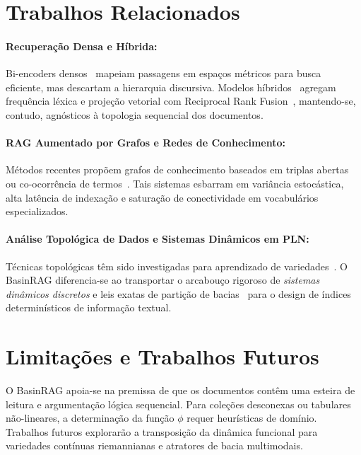 \documentclass[10pt,twocolumn]{article}
\theoremstyle{definition}
\begin{document}
\section{Trabalhos Relacionados}

\paragraph{Recuperação Densa e Híbrida:}
Bi-encoders densos~\cite{karpukhin2020dense,xiao2023c} mapeiam passagens em espaços métricos para busca eficiente, mas descartam a hierarquia discursiva. Modelos híbridos~\cite{formal2021splade} agregam frequência léxica e projeção vetorial com Reciprocal Rank Fusion~\cite{cormack2009reciprocal}, mantendo-se, contudo, agnósticos à topologia sequencial dos documentos.

\paragraph{RAG Aumentado por Grafos e Redes de Conhecimento:}
Métodos recentes propõem grafos de conhecimento baseados em triplas abertas ou co-ocorrência de termos~\cite{pan2024unifying}. Tais sistemas esbarram em variância estocástica, alta latência de indexação e saturação de conectividade em vocabulários especializados.

\paragraph{Análise Topológica de Dados e Sistemas Dinâmicos em PLN:}
Técnicas topológicas têm sido investigadas para aprendizado de variedades~\cite{carlsson2009topology}. O BasinRAG diferencia-se ao transportar o arcabouço rigoroso de \textit{sistemas dinâmicos discretos} e leis exatas de partição de bacias~\cite{martins2026iterated} para o design de índices determinísticos de informação textual.

\section{Limitações e Trabalhos Futuros}

O BasinRAG apoia-se na premissa de que os documentos contêm uma esteira de leitura e argumentação lógica sequencial. Para coleções desconexas ou tabulares não-lineares, a determinação da função $\phi$ requer heurísticas de domínio. Trabalhos futuros explorarão a transposição da dinâmica funcional para variedades contínuas riemannianas e atratores de bacia multimodais.
\end{document}
